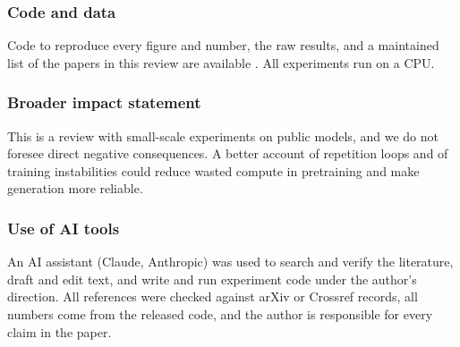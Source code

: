 \subsubsection*{Code and data}
Code to reproduce every figure and number, the raw results, and a maintained list of the papers in this review are available \codeurl. All experiments run on a CPU.

\subsubsection*{Broader impact statement}
This is a review with small-scale experiments on public models, and we do not foresee direct negative consequences. A better account of repetition loops and of training instabilities could reduce wasted compute in pretraining and make generation more reliable.

\subsubsection*{Use of AI tools}
\label{sec:ai}
An AI assistant (Claude, Anthropic) was used to search and verify the literature, draft and edit text, and write and run experiment code under the author's direction. All references were checked against arXiv or Crossref records, all numbers come from the released code, and the author is responsible for every claim in the paper.
